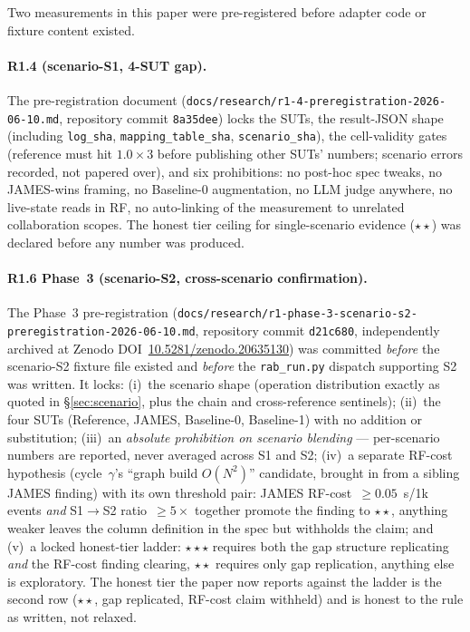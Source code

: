 \documentclass[11pt,a4paper]{article}
\begin{document}
Two measurements in this paper were pre-registered before adapter code or fixture content existed.

\paragraph{R1.4 (scenario-S1, 4-SUT gap).} The pre-registration document (\texttt{docs/research/r1-4-preregistration-2026-06-10.md}, repository commit \texttt{8a35dee}) locks the SUTs, the result-JSON shape (including \texttt{log\_sha}, \texttt{mapping\_table\_sha}, \texttt{scenario\_sha}), the cell-validity gates (reference must hit $1.0\times 3$ before publishing other SUTs' numbers; scenario errors recorded, not papered over), and six prohibitions: no post-hoc spec tweaks, no JAMES-wins framing, no Baseline-0 augmentation, no LLM judge anywhere, no live-state reads in RF, no auto-linking of the measurement to unrelated collaboration scopes. The honest tier ceiling for single-scenario evidence ($\star\star$) was declared before any number was produced.

\paragraph{R1.6 Phase~3 (scenario-S2, cross-scenario confirmation).} The Phase~3 pre-registration (\texttt{docs/research/r1-phase-3-scenario-s2-preregistration-2026-06-10.md}, repository commit \texttt{d21c680}, independently archived at Zenodo DOI~\href{https://doi.org/10.5281/zenodo.20635130}{10.5281/zenodo.20635130}) was committed \emph{before} the scenario-S2 fixture file existed and \emph{before} the \texttt{rab\_run.py} dispatch supporting S2 was written. It locks: (i)~the scenario shape (operation distribution exactly as quoted in §\ref{sec:scenario}, plus the chain and cross-reference sentinels); (ii)~the four SUTs (Reference, JAMES, Baseline-0, Baseline-1) with no addition or substitution; (iii)~an \emph{absolute prohibition on scenario blending} --- per-scenario numbers are reported, never averaged across S1 and S2; (iv)~a separate RF-cost hypothesis (cycle~$\gamma$'s ``graph build $O(N^2)$'' candidate, brought in from a sibling JAMES finding) with its own threshold pair: JAMES RF-cost~$\ge 0.05$~s/1k events \emph{and} S1$\to$S2 ratio~$\ge 5\times$ together promote the finding to $\star\star$, anything weaker leaves the column definition in the spec but withholds the claim; and (v)~a locked honest-tier ladder: $\star\star\star$ requires both the gap structure replicating \emph{and} the RF-cost finding clearing, $\star\star$ requires only gap replication, anything else is exploratory. The honest tier the paper now reports against the ladder is the second row ($\star\star$, gap replicated, RF-cost claim withheld) and is honest to the rule as written, not relaxed.
\end{document}
